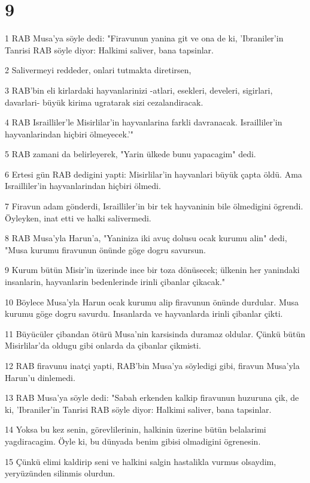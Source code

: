 \chapter{9}

\par 1 RAB Musa'ya söyle dedi: "Firavunun yanina git ve ona de ki, 'Ibraniler'in Tanrisi RAB söyle diyor: Halkimi saliver, bana tapsinlar.
\par 2 Salivermeyi reddeder, onlari tutmakta diretirsen,
\par 3 RAB'bin eli kirlardaki hayvanlarinizi -atlari, esekleri, develeri, sigirlari, davarlari- büyük kirima ugratarak sizi cezalandiracak.
\par 4 RAB Israilliler'le Misirlilar'in hayvanlarina farkli davranacak. Israilliler'in hayvanlarindan hiçbiri ölmeyecek.'"
\par 5 RAB zamani da belirleyerek, "Yarin ülkede bunu yapacagim" dedi.
\par 6 Ertesi gün RAB dedigini yapti: Misirlilar'in hayvanlari büyük çapta öldü. Ama Israilliler'in hayvanlarindan hiçbiri ölmedi.
\par 7 Firavun adam gönderdi, Israilliler'in bir tek hayvaninin bile ölmedigini ögrendi. Öyleyken, inat etti ve halki salivermedi.
\par 8 RAB Musa'yla Harun'a, "Yaniniza iki avuç dolusu ocak kurumu alin" dedi, "Musa kurumu firavunun önünde göge dogru savursun.
\par 9 Kurum bütün Misir'in üzerinde ince bir toza dönüsecek; ülkenin her yanindaki insanlarin, hayvanlarin bedenlerinde irinli çibanlar çikacak."
\par 10 Böylece Musa'yla Harun ocak kurumu alip firavunun önünde durdular. Musa kurumu göge dogru savurdu. Insanlarda ve hayvanlarda irinli çibanlar çikti.
\par 11 Büyücüler çibandan ötürü Musa'nin karsisinda duramaz oldular. Çünkü bütün Misirlilar'da oldugu gibi onlarda da çibanlar çikmisti.
\par 12 RAB firavunu inatçi yapti, RAB'bin Musa'ya söyledigi gibi, firavun Musa'yla Harun'u dinlemedi.
\par 13 RAB Musa'ya söyle dedi: "Sabah erkenden kalkip firavunun huzuruna çik, de ki, 'Ibraniler'in Tanrisi RAB söyle diyor: Halkimi saliver, bana tapsinlar.
\par 14 Yoksa bu kez senin, görevlilerinin, halkinin üzerine bütün belalarimi yagdiracagim. Öyle ki, bu dünyada benim gibisi olmadigini ögrenesin.
\par 15 Çünkü elimi kaldirip seni ve halkini salgin hastalikla vurmus olsaydim, yeryüzünden silinmis olurdun.

